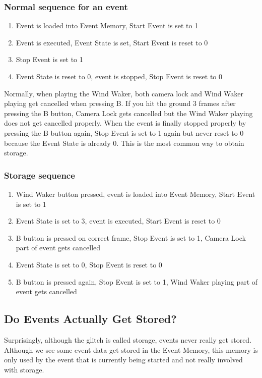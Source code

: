 \documentclass[titlepage,12pt,a4paper]{article}
\begin{document}
\subsubsection{Normal sequence for an event}
\begin{enumerate}
	\item Event is loaded into Event Memory, Start Event is set to 1
	\item Event is executed, Event State is set, Start Event is reset to 0
	\item Stop Event is set to 1
	\item Event State is reset to 0, event is stopped, Stop Event is reset to 0
\end{enumerate}

Normally, when playing the Wind Waker, both camera lock and Wind Waker playing get cancelled when pressing B. If you hit the ground 3 frames after pressing the B button, Camera Lock gets cancelled but the Wind Waker playing does not get cancelled properly. When the event is finally stopped properly by pressing the B button again, Stop Event is set to 1 again but never reset to 0 because the Event State is already 0. This is the most common way to obtain storage.

\subsubsection{Storage sequence}
\begin{enumerate}
	\item Wind Waker button pressed, event is loaded into Event Memory, Start Event is set to 1
	\item Event State is set to 3, event is executed, Start Event is reset to 0
	\item B button is pressed on correct frame, Stop Event is set to 1, Camera Lock part of event gets cancelled
	\item Event State is set to 0, Stop Event is reset to 0
	\item B button is pressed again, Stop Event is set to 1, Wind Waker playing part of event gets cancelled
\end{enumerate}

\subsection{Do Events Actually Get Stored?}
Surprisingly, although the glitch is called storage, events never really get stored. Although we see some event data get stored in the Event Memory, this memory is only used by the event that is currently being started and not really involved with storage.
\end{document}
